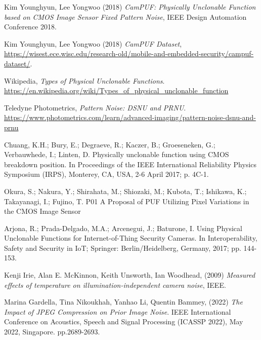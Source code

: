 \begin{thebibliography}{9}

Kim Younghyun, Lee Yongwoo (2018) \emph{CamPUF: Physically Unclonable Function based on CMOS Image Sensor Fixed Pattern Noise}, IEEE Design Automation Conference 2018.

Kim Younghyun, Lee Yongwoo (2018) \emph{CamPUF Dataset}, \url{https://wisest.ece.wisc.edu/research-old/mobile-and-embedded-security/campuf-dataset/}.

Wikipedia, \emph{Types of Physical Unclonable Functions}. \url{https://en.wikipedia.org/wiki/Types_of_physical_unclonable_function}

Teledyne Photometrics, \emph{Pattern Noise: DSNU and PRNU}. \url{https://www.photometrics.com/learn/advanced-imaging/pattern-noise-dsnu-and-prnu}

Chuang, K.H.; Bury, E.; Degraeve, R.; Kaczer, B.; Groeseneken, G.; Verbauwhede, I.; Linten, D. Physically unclonable function
using CMOS breakdown position. In Proceedings of the IEEE International Reliability Physics Symposium (IRPS), Monterey, CA,
USA, 2-6 April 2017; p. 4C-1.

Okura, S.; Nakura, Y.; Shirahata, M.; Shiozaki, M.; Kubota, T.; Ishikawa, K.; Takayanagi, I.; Fujino, T. P01 A Proposal of PUF
Utilizing Pixel Variations in the CMOS Image Sensor

Arjona, R.; Prada-Delgado, M.A.; Arcenegui, J.; Baturone, I. Using Physical Unclonable Functions for Internet-of-Thing Security
Cameras. In Interoperability, Safety and Security in IoT; Springer: Berlin/Heidelberg, Germany, 2017; pp. 144-153.

Kenji Irie, Alan E. McKinnon, Keith Unsworth, Ian Woodhead, (2009) \emph{Measured effects of temperature on illumination-independent camera noise}, IEEE.

Marina Gardella, Tina Nikoukhah, Yanhao Li, Quentin Bammey, (2022) \emph{The Impact of JPEG Compression on Prior Image Noise}.  IEEE International Conference on Acoustics, Speech and Signal Processing (ICASSP 2022), May 2022, Singapore. pp.2689-2693.

\end{thebibliography}
